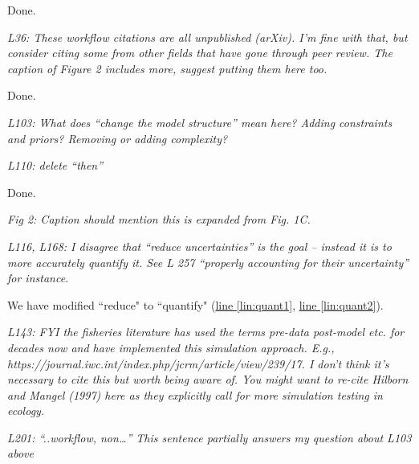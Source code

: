 \documentclass[11pt,letter]{article}
\begin{document}
Done.

\begin{mybox}
\emph{L36: These workflow citations are all unpublished (arXiv). I’m fine with that, but consider citing some from other fields that have gone through peer review. The caption of Figure 2 includes more, suggest putting them here too.}
\end{mybox}

Done.

\begin{mybox}
\emph{L103: What does “change the model structure” mean here? Adding constraints and priors? Removing or adding complexity?}
\end{mybox}



\begin{mybox}
\emph{L110: delete “then”}
\end{mybox}

Done. %

\begin{mybox}
\emph{Fig 2: Caption should mention this is expanded from Fig. 1C.}
\end{mybox}


\begin{mybox}
\emph{L116, L168: I disagree that “reduce uncertainties” is the goal – instead it is to more accurately quantify it. See L 257 “properly accounting for their uncertainty” for instance.}
\end{mybox}

We have modified ``reduce" to ``quantify" (\href{file:forecastflows_r1\#lintarget:quant1}{line \ref*{lin:quant1}}, \href{file:forecastflows_r1\#lintarget:quant2}{line \ref*{lin:quant2}}).

\begin{mybox}
\emph{L143: FYI the fisheries literature has used the terms pre-data post-model etc. for decades now and have implemented this simulation approach. E.g., https://journal.iwc.int/index.php/jcrm/article/view/239/17. I don’t think it’s necessary to cite this but worth being aware of. You might want to re-cite Hilborn and Mangel (1997) here as they explicitly call for more simulation testing in ecology.}
\end{mybox}

\begin{mybox}
\emph{L201: “..workflow, non…” This sentence partially answers my question about L103 above}
\end{mybox}
\end{document}
